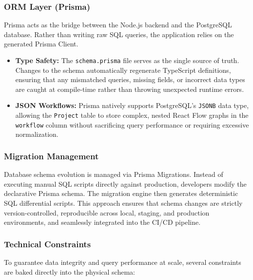 \subsubsection{ORM Layer (Prisma)}
Prisma acts as the bridge between the Node.js backend and the PostgreSQL database. Rather than writing raw SQL queries, the application relies on the generated Prisma Client.
\begin{itemize}
    \item \textbf{Type Safety:} The \texttt{schema.prisma} file serves as the single source of truth. Changes to the schema automatically regenerate TypeScript definitions, ensuring that any mismatched queries, missing fields, or incorrect data types are caught at compile-time rather than throwing unexpected runtime errors.
    \item \textbf{JSON Workflows:} Prisma natively supports PostgreSQL's \texttt{JSONB} data type, allowing the \texttt{Project} table to store complex, nested React Flow graphs in the \texttt{workflow} column without sacrificing query performance or requiring excessive normalization.
\end{itemize}

\subsubsection{Migration Management}
Database schema evolution is managed via Prisma Migrations. Instead of executing manual SQL scripts directly against production, developers modify the declarative Prisma schema. The migration engine then generates deterministic SQL differential scripts. This approach ensures that schema changes are strictly version-controlled, reproducible across local, staging, and production environments, and seamlessly integrated into the CI/CD pipeline.

\subsubsection{Technical Constraints}
To guarantee data integrity and query performance at scale, several constraints are baked directly into the physical schema:

